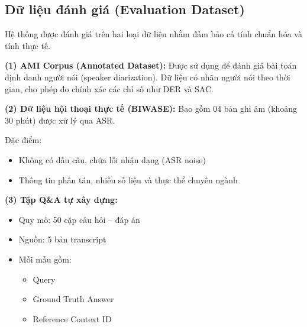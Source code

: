 \subsection{Dữ liệu đánh giá (Evaluation Dataset)}

Hệ thống được đánh giá trên hai loại dữ liệu nhằm đảm bảo cả tính chuẩn hóa và tính thực tế.

\textbf{(1) AMI Corpus (Annotated Dataset):}
Được sử dụng để đánh giá bài toán định danh người nói (speaker diarization). Dữ liệu có nhãn người nói theo thời gian, cho phép đo chính xác các chỉ số như DER và SAC.

\textbf{(2) Dữ liệu hội thoại thực tế (BIWASE):}
Bao gồm 04 bản ghi âm (khoảng 30 phút) được xử lý qua ASR.

Đặc điểm:
\begin{itemize}
    \item Không có dấu câu, chứa lỗi nhận dạng (ASR noise)
    \item Thông tin phân tán, nhiều số liệu và thực thể chuyên ngành
\end{itemize}

\textbf{(3) Tập Q\&A tự xây dựng:}
\begin{itemize}
    \item Quy mô: 50 cặp câu hỏi – đáp án
    \item Nguồn: 5 bản transcript
    \item Mỗi mẫu gồm:
    \begin{itemize}
        \item Query
        \item Ground Truth Answer
        \item Reference Context ID
    \end{itemize}
\end{itemize}